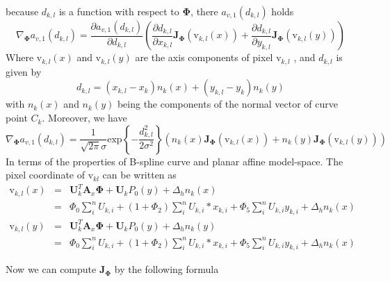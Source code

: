 because $d_{k,l}$ is a function with respect to $\mathbf{\Phi}$, there
$a_{v,1}(d_{k,l})$ holds
\begin{equation}
  \label{eq:5.26}
\nabla_{\mathbf{\Phi}} a_{v,1}(d_{k,l}) = \frac{\partial a_{v,1}(d_{k,l})}{\partial d_{k,l}}
\left( \frac{\partial d_{k,l}}{\partial x_{k,l}}\mathbf{J}_{\mathbf{\Phi}}(\mathrm{v}_{k,l}(x)) + \frac{\partial d_{k,l}}{\partial y_{k,l}}\mathbf{J}_{\mathbf{\Phi}}(\mathrm{v}_{k,l}(y))
 \right)  
\end{equation}
Where $\mathrm{v}_{k,l}(x)$ and $\mathrm{v}_{k,l}(y)$ are the axis
components of pixel $\mathrm{v}_{k,l}$ , and $d_{k,l}$ is given by
\begin{equation}
  \label{eq:5.27}
  d_{k,l} = (x_{k,l} - x_{k})n_{k}(x) +(y_{k,l} - y_{k}) n_{k}(y)
\end{equation}
with $n_{k}(x)$ and $n_{k}(y)$ being the components of the normal vector of
curve point $C_{k}$. Moreover, we have
\begin{equation}
  \label{eq:5.28}
  \nabla_{\mathbf{\Phi}} a_{v,1}(d_{k,l}) = \frac{1}{\sqrt{2\pi}\sigma} \mathrm{exp}\left\{ -\frac{d_{k,l}^2}{2\sigma^2} \right\}
\left( n_k(x)\mathbf{J}_{\mathbf{\Phi}}(\mathrm{v}_{k,l}(x)) + n_k(y)\mathbf{J}_{\mathbf{\Phi}}(\mathrm{v}_{k,l}(y))
 \right) 
\end{equation}
In terms of the properties of  B-spline curve  and planar affine
model-space. The pixel coordinate of $\mathrm{v}_{kl}$ can be written
as
\begin{eqnarray}
  \label{eq:5.29}
\mathrm{v}_{k,l}(x) &= & \mathbf{U}_k^{T}\mathbf{A}_x \mathbf{\Phi} + \mathbf{U}_k P_0(y) + \Delta_h n_k(x) \\
          &=&\Phi_0\sum_{i}^nU_{k,i} +
          (1+\Phi_2)\sum_{i}^nU_{k,i}*x_{k,i} + \Phi_{5}\sum_{i}^n
          U_{k,i}y_{k,i} + \Delta_h n_k(x)\\
\mathrm{v}_{k,l}(y) &=& \mathbf{U}_k^{T}\mathbf{A}_x \mathbf{\Phi} +
\mathbf{U}_k P_0(y) + \Delta_h n_k(y) \\
          &=&\Phi_0\sum_{i}^nU_{k,i} +
          (1+\Phi_2)\sum_{i}^nU_{k,i}*x_{k,i} + \Phi_{5}\sum_{i}^n
          U_{k,i}y_{k,i} + \Delta_h n_k(x)
\end{eqnarray}

Now we can compute $\mathbf{J}_{\mathbf{\Phi}}$ by the following
formula

